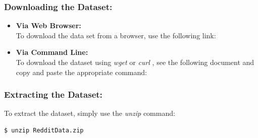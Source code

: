 \documentclass{article}
\begin{document}
\subsubsection*{Downloading the Dataset:}
\begin{itemize}
    \item \textbf{Via Web Browser:}\\
        To download the data set from a browser, use the following link:
        \begin{center}
        \href{https://drive.google.com/uc?export=download&id=1zhtVn8-64QKpjl_y0uHWImooeSJkv7bc}{\color{blue}{https://drive.google.com/uc?export=download\&id=1zhtVn8-64QKpjl\_y0uHWImooeSJkv7bc}}
        \end{center}
    \item \textbf{Via Command Line:}\\
     To download the dataset using \textit{wget} or \textit{curl} , see the following document and copy and paste the appropriate command:
        \href{https://raw.githubusercontent.com/DaveedDomingo/Spark-Reddit-Netflix-Project/master/DownloadRedditData.txt}{\color{blue}{https://raw.githubusercontent.com/DaveedDomingo/Spark-Reddit-Netflix-Project/master/DownloadRedditData.txt}}
        

\end{itemize}

\subsubsection*{Extracting the Dataset:}
To extract the dataset, simply use the \textit{unzip} command:
\begin{commandline}\begin{verbatim}$ unzip RedditData.zip\end{verbatim}\end{commandline}
\end{document}
